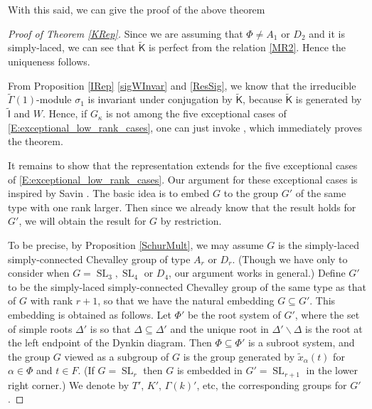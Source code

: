 \documentclass[10pt, letterpaper]{amsart}
\theoremstyle{plain}
\theoremstyle{definition}
\numberwithin{equation}{section}
\newcommand{\SL}{\operatorname{SL}}
\newcommand{\xt}{\tilde{x}}
\newcommand{\If}{\mathsf{I}}
\newcommand{\Kf}{\mathsf{K}}
\newcommand{\Gammaf}{\mathsf{\Gamma}}
\newcommand{\Kft}{\widetilde{\mathsf{K}}}
\begin{document}
With this said, we can give the proof of the above theorem
\begin{proof}[Proof of Theorem \ref{KRep}]
 Since we are assuming that $\Phi\neq A_{1}$ or $D_2$ and it is simply-laced, we can see that $\Kft$ is perfect from the relation \eqref{MR2}.  Hence the uniqueness follows.
    
	From Proposition \ref{IRep} \eqref{sigWInvar} and \eqref{ResSig}, we know that the irreducible $\widetilde{{\Gammaf}}(1)$-module $\sigma_{1}$ is invariant under conjugation by $\widetilde{{\Kf}}$, because $\widetilde{{\Kf}}$ is generated by $\widetilde{{\If}}$ and $W$. Hence, if $G_\kappa$ is not among the five exceptional cases of \eqref{E:exceptional_low_rank_cases}, one can just invoke \cite[(11.45) Proposition]{CR81}, which immediately proves the theorem.
    
    It remains to show that the representation extends for the five exceptional cases of \eqref{E:exceptional_low_rank_cases}. Our argument for these exceptional cases is inspired by Savin \cite[Proposition 4.1]{S12}. The basic idea is to embed $G$ to the group $G'$ of the same type with one rank larger. Then since we already know that the result holds for $G'$, we will obtain the result for $G$ by restriction.

    To be precise, by Proposition \ref{SchurMult}, we may assume $G$ is the simply-laced simply-connected Chevalley group of type $A_r$ or $D_r$. (Though we have only to consider when $G=\SL_3, \SL_4$ or $D_4$, our argument works in general.) Define $G'$ to be the simply-laced simply-connected Chevalley group of the same type as that of $G$ with rank $r+1$, so that we have the natural embedding $G\subseteq G'$. This embedding is obtained as follows. Let $\Phi'$ be the root system of $G'$, where the set of simple roots $\Delta'$ is so that $\Delta\subseteq\Delta'$ and the unique root in $\Delta'\smallsetminus\Delta$ is the root at the left endpoint of the Dynkin diagram. Then $\Phi\subseteq\Phi'$ is a subroot system, and the group $G$ viewed as a subgroup of $G$ is the group generated by $\xt_{\alpha}(t)$ for $\alpha\in\Phi$ and $t\in F$. (If $G=\SL_r$ then $G$ is embedded in $G'=\SL_{r+1}$ in the lower right corner.) We denote by $T'$, $K'$, $\Gamma(k)'$, etc, the corresponding groups for $G'$.


\end{proof}
\end{document}
